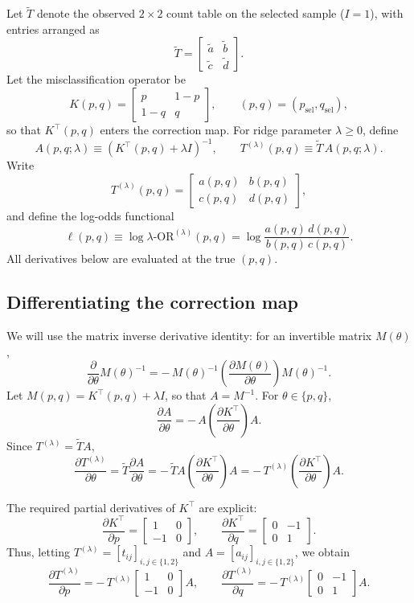 \documentclass[pdflatex,sn-mathphys-num]{sn-jnl}%
\newcommand{\SPOR}{\textrm{$\lambda$-OR}}
\newcommand{\logor}{\log\SPOR}
\theoremstyle{thmstyleone}%
\theoremstyle{thmstyletwo}%
\theoremstyle{thmstylethree}%
\begin{document}
Let $\tilde T$ denote the observed $2\times2$ count table on the selected sample ($I=1$),
with entries arranged as
\[
\tilde T=
\begin{bmatrix}
\tilde a & \tilde b\\
\tilde c & \tilde d
\end{bmatrix}.
\]
Let the misclassification operator be
\[
K(p,q)=
\begin{bmatrix}
p & 1-p\\
1-q & q
\end{bmatrix},
\qquad (p,q)=(p_{\mathrm{sel}},q_{\mathrm{sel}}),
\]
so that $K^\top(p,q)$ enters the correction map. For ridge parameter $\lambda\ge 0$, define
\[
A(p,q;\lambda) \equiv (K^\top(p,q)+\lambda I)^{-1},
\qquad
T^{(\lambda)}(p,q) \equiv \tilde T\,A(p,q;\lambda).
\]
Write
\[
T^{(\lambda)}(p,q)=
\begin{bmatrix}
a(p,q) & b(p,q)\\
c(p,q) & d(p,q)
\end{bmatrix},
\]
and define the log-odds functional
\[
\ell(p,q)\equiv \logor^{(\lambda)}(p,q)=\log\frac{a(p,q)\,d(p,q)}{b(p,q)\,c(p,q)}.
\]
All derivatives below are evaluated at the true $(p,q)$.

\subsection*{Differentiating the correction map}

We will use the matrix inverse derivative identity: for an invertible matrix $M(\theta)$,
\[
\frac{\partial}{\partial \theta}M(\theta)^{-1}
=
-\,M(\theta)^{-1}\left(\frac{\partial M(\theta)}{\partial \theta}\right)M(\theta)^{-1}.
\]
Let $M(p,q)=K^\top(p,q)+\lambda I$, so that $A=M^{-1}$.
For $\theta\in\{p,q\}$,
\[
\frac{\partial A}{\partial \theta}
=
-\,A\left(\frac{\partial K^\top}{\partial \theta}\right)A.
\]
Since $T^{(\lambda)}=\tilde T A$,
\[
\frac{\partial T^{(\lambda)}}{\partial \theta}
=
\tilde T \frac{\partial A}{\partial \theta}
=
-\,\tilde T A\left(\frac{\partial K^\top}{\partial \theta}\right)A
=
-\,T^{(\lambda)}\left(\frac{\partial K^\top}{\partial \theta}\right)A.
\]

The required partial derivatives of $K^\top$ are explicit:
\[
\frac{\partial K^\top}{\partial p}
=
\begin{bmatrix}
1 & 0\\
-1 & 0
\end{bmatrix},
\qquad
\frac{\partial K^\top}{\partial q}
=
\begin{bmatrix}
0 & -1\\
0 & 1
\end{bmatrix}.
\]
Thus, letting $T^{(\lambda)}=[t_{ij}]_{i,j\in\{1,2\}}$ and $A=[a_{ij}]_{i,j\in\{1,2\}}$, we obtain
\[
\frac{\partial T^{(\lambda)}}{\partial p}
=
-\,T^{(\lambda)}
\begin{bmatrix}
1 & 0\\
-1 & 0
\end{bmatrix}A,
\qquad
\frac{\partial T^{(\lambda)}}{\partial q}
=
-\,T^{(\lambda)}
\begin{bmatrix}
0 & -1\\
0 & 1
\end{bmatrix}A.
\]
\end{document}
